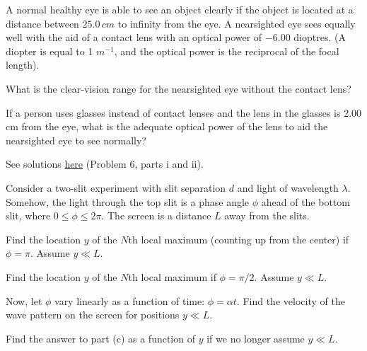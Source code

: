 \documentclass[11pt]{scrartcl}
\begin{document}
\begin{prob}[NBPhO]
A normal healthy eye is able to see an object clearly if the object is located at a distance between $25.0 \, \unit{cm}$ to infinity from the eye. A nearsighted eye sees equally well with the aid of a contact lens with an optical power of $-6.00$ dioptres. (A diopter is equal to 1 $\unit{m^{-1}}$, and the optical power is the reciprocal of the focal length). 
\begin{anum}
    \item What is the clear‐vision range for the nearsighted eye without the contact lens?
    \item  If a person uses glasses instead of contact lenses and the lens in the glasses is 2.00 cm from the eye, what is the adequate optical power of the lens to aid the nearsighted eye to see normally?
\end{anum}
\end{prob}

\begin{sol}
    See solutions \href{https://nbpho.ee/wp-content/uploads/2022/NBPhO_2022_solutions.pdf}{here} (Problem 6, parts i and ii).
\end{sol}

\begin{prob}
    Consider a two-slit experiment with slit separation $d$ and light of wavelength $\lambda$. Somehow, the light through the top slit is a phase angle $\phi$ ahead of the bottom slit, where $0\leq \phi \leq 2\pi$. The screen is a distance $L$ away from the slits. 
    \begin{anum}
        \item Find the location $y$ of the $N$th local maximum (counting up from the center) if $\phi=\pi$. Assume $y\ll L$. 
        \item Find the location $y$ of the $N$th local maximum if $\phi=\pi/2$. Assume $y\ll L$.
        \item Now, let $\phi$ vary linearly as a function of time: $\phi=\alpha t$. Find the velocity of the wave pattern on the screen for positions $y\ll L$.
        \item Find the answer to part (c) as a function of $y$ if we no longer assume $y\ll L$. 
    \end{anum}
\end{prob}
\end{document}
